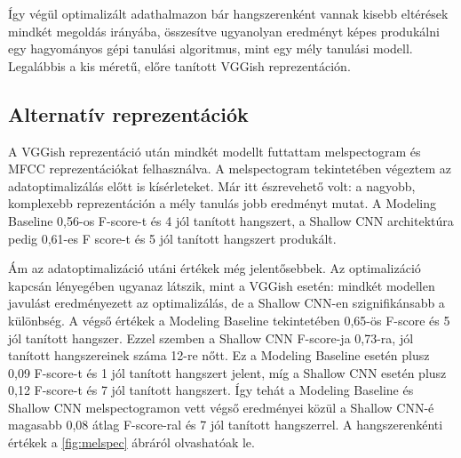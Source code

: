 Így végül optimalizált adathalmazon bár hangszerenként vannak kisebb eltérések mindkét megoldás irányába, összesítve ugyanolyan eredményt képes produkálni egy hagyományos gépi tanulási algoritmus, mint egy mély tanulási modell. Legalábbis a kis méretű, előre tanított VGGish reprezentáción.

\subsection{Alternatív reprezentációk}

A VGGish reprezentáció után mindkét modellt futtattam melspectogram és MFCC reprezentációkat felhasználva. A melspectogram tekintetében végeztem az adatoptimalizálás előtt is kísérleteket. Már itt észrevehető volt: a nagyobb, komplexebb reprezentáción a mély tanulás jobb eredményt mutat. A Modeling Baseline 0,56-os F-score-t és 4 jól tanított hangszert, a Shallow CNN architektúra pedig 0,61-es F score-t és 5 jól tanított hangszert produkált.

Ám az adatoptimalizáció utáni értékek még jelentősebbek. Az optimalizáció kapcsán lényegében ugyanaz látszik, mint a VGGish esetén: mindkét modellen javulást eredményezett az optimalizálás, de a Shallow CNN-en szignifikánsabb a különbség. A végső értékek a Modeling Baseline tekintetében 0,65-ös F-score és 5 jól tanított hangszer. Ezzel szemben a Shallow CNN F-score-ja 0,73-ra, jól tanított hangszereinek száma 12-re nőtt. Ez a Modeling Baseline esetén plusz 0,09 F-score-t és 1 jól tanított hangszert jelent, míg a Shallow CNN esetén plusz 0,12 F-score-t és 7 jól tanított hangszert. Így tehát a Modeling Baseline és Shallow CNN melspectogramon vett végső eredményei közül a Shallow CNN-é magasabb 0,08 átlag F-score-ral és 7 jól tanított hangszerrel. A hangszerenkénti értékek a \ref{fig:melspec} ábráról olvashatóak le.

